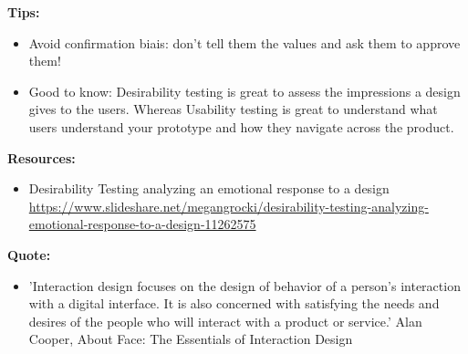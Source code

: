 \textbf{Tips:}

\begin{itemize}
\item Avoid confirmation biais: don't tell them the values and ask them to approve them!
\item Good to know: Desirability testing is great to assess the impressions a design gives to the users. Whereas Usability testing is great to understand what users understand your prototype and how they navigate across the product.
\end{itemize}

\textbf{Resources:}

\begin{itemize}
\item Desirability Testing analyzing an emotional response to a design \url{https://www.slideshare.net/megangrocki/desirability-testing-analyzing-emotional-response-to-a-design-11262575}
\end{itemize}

\textbf{Quote:}

\begin{itemize}
\item 'Interaction design focuses on the design of behavior of a person's interaction with a digital interface. It is also concerned with satisfying the needs and desires of the people who will interact with a product or service.' Alan Cooper, About Face: The Essentials of Interaction Design
\end{itemize}

